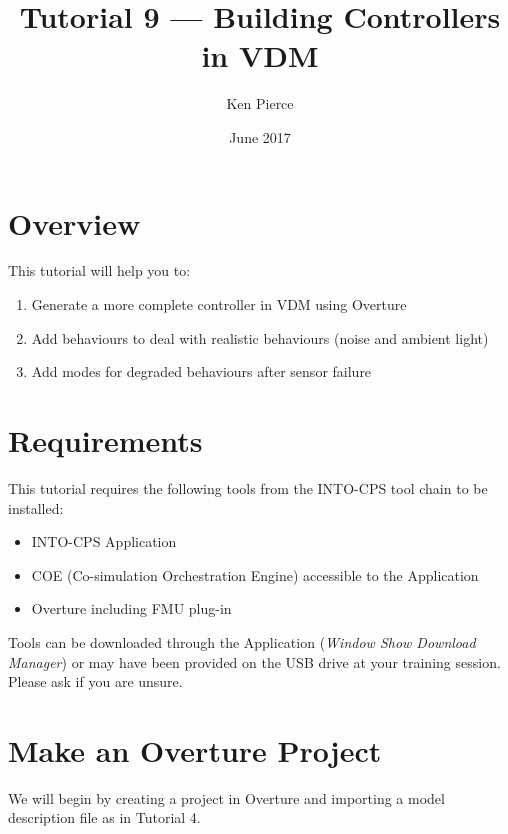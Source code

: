 \documentclass[11pt,a4paper]{../tutorial}
\title{Tutorial 9 --- Building Controllers in VDM}
\date{June 2017}
\author{Ken Pierce}
\begin{document}
\section*{Overview}

This tutorial will help you to:

\begin{enumerate}[noitemsep]
\item Generate a more complete controller in VDM using Overture
\item Add behaviours to deal with realistic behaviours (noise and ambient light)
\item Add modes for degraded behaviours after sensor failure
\end{enumerate}

\section*{Requirements}

This tutorial requires the following tools from the INTO-CPS tool chain to be installed:

\begin{itemize}[noitemsep]
\item INTO-CPS Application
\item COE (Co-simulation Orchestration Engine) accessible to the Application
\item Overture including FMU plug-in
\end{itemize}

Tools can be downloaded through the Application (\emph{Window \menusep Show Download Manager}) or may have been provided on the USB drive at your training session. Please ask if you are unsure.

\section{Make an Overture Project}

We will begin by creating a project in Overture and importing a model description file as in Tutorial 4.
\end{document}
